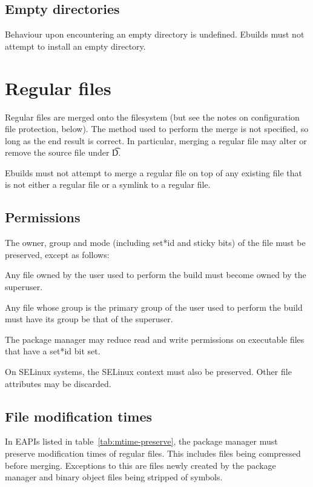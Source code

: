 \subsection{Empty directories}

Behaviour upon encountering an empty directory is undefined. Ebuilds must not attempt to install an
empty directory.

\section{Regular files}

Regular files are merged onto the filesystem (but see the notes on configuration file protection,
below). The method used to perform the merge is not specified, so long as the end result is correct.
In particular, merging a regular file may alter or remove the source file under \t{D}.

Ebuilds must not attempt to merge a regular file on top of any existing file that is not either a
regular file or a symlink to a regular file.

\subsection{Permissions}

The owner, group and mode (including set*id and sticky bits) of the file must be preserved, except
as follows:

\begin{compactitem}
\item Any file owned by the user used to perform the build must become owned by the superuser.
\item Any file whose group is the primary group of the user used to perform the build must have
    its group be that of the superuser.
\item The package manager may reduce read and write permissions on executable files that have a
    set*id bit set.
\end{compactitem}

On SELinux systems, the SELinux context must also be preserved. Other
file attributes may be discarded.

\subsection{File modification times}

In EAPIs listed in table~\ref{tab:mtime-preserve}, the package manager
must preserve modification times of regular files. This includes files
being compressed before merging. Exceptions to this are files newly
created by the package manager and binary object files being stripped
of symbols.

